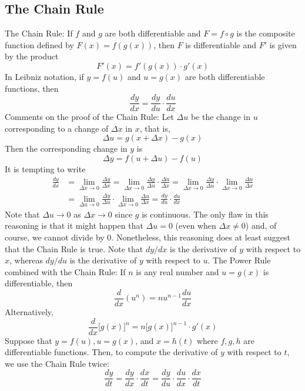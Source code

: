 \subsection{The Chain Rule}

The Chain Rule: If \(f\) and \(g\) are both differentiable and \(F=f\circ g\)
is the composite function defined by \(F(x)=f(g(x))\), then \(F\) is
differentiable and \(F'\) is given by the product
\[F'(x)=f'(g(x))\cdot g'(x)\]
In Leibniz notation, if \(y=f(u)\) and \(u=g(x)\) are both differentiable
functions, then
\[\frac{dy}{dx}=\frac{dy}{du}\cdot\frac{du}{dx}\]
Comments on the proof of the Chain Rule: Let \(\Delta u\) be the change in
\(u\) corresponding to a change of \(\Delta x\) in \(x\), that is,
\[\Delta u=g(x+\Delta x)-g(x)\]
Then the corresponding change in \(y\) is
\[\Delta y=f(u+\Delta u)-f(u)\]
It is tempting to write
\begin{align*}
    \frac{dy}{dx} &= \lim_{\Delta x\to 0}\frac{\Delta y}{\Delta x}
    =\lim_{\Delta x\to 0}
    \frac{\Delta y}{\Delta u}\cdot\frac{\Delta u}{\Delta x}
    =\lim_{\Delta x\to 0}\frac{\Delta y}{\Delta u}
    \cdot\lim_{\Delta x\to 0}\frac{\Delta u}{\Delta x} \\
    &= \lim_{\Delta u\to 0}\frac{\Delta y}{\Delta u}
    \cdot\lim_{\Delta x\to 0}\frac{\Delta u}{\Delta x}
    =\frac{dy}{du}\cdot\frac{du}{dx}
\end{align*}
Note that \(\Delta u\to 0\) as \(\Delta x\to 0\) since \(g\) is continuous.
The only flaw in this reasoning is that it might happen that \(\Delta u=0\)
(even when \(\Delta x\neq 0\)) and, of course, we cannot divide by 0.
Nonetheless, this reasoning does at least suggest that the Chain Rule is true.
Note that \(dy/dx\) is the derivative of \(y\) with respect to \(x\), whereas
\(dy/du\) is the derivative of \(y\) with respect to \(u\).
The Power Rule combined with the Chain Rule: If \(n\) is any real number and
\(u=g(x)\) is differentiable, then
\[\frac{d}{dx}(u^n)=nu^{n-1}\frac{du}{dx}\]
Alternatively,
\[\frac{d}{dx}\big[g(x)\big]^n=n\big[g(x)\big]^{n-1}\cdot g'(x)\]
Suppose that \(y=f(u),u=g(x)\), and \(x=h(t)\) where \(f,g,h\) are
differentiable functions.
Then, to compute the derivative of \(y\) with respect to \(t\), we use the
Chain Rule twice:
\[\frac{dy}{dt}=\frac{dy}{dx}\cdot\frac{dx}{dt}
=\frac{dy}{du}\cdot\frac{du}{dx}\cdot\frac{dx}{dt}\]

